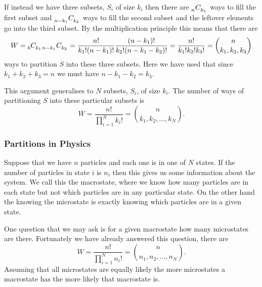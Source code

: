     If instead we have three subsets, \(S_i\) of size \(k_i\) then there are \(\combs{n}{k_1}\) ways to fill the first subset and \(\combs{n-k_1}{k_2}\) ways to fill the second subset and the leftover elements go into the third subset.
    By the multiplication principle this means that there are
    \[W = \combs{b}{k_1}\combs{n-k_1}{k_2} = \frac{n!}{k_1!(n - k_1)!}\frac{(n - k_1)!}{k_2!(n - k_1 - k_2)!} = \frac{n!}{k_1!k_2!k_3!} = {n \choose k_1, k_2, k_3}\]
    ways to partition \(S\) into these three subsets.
    Here we have used that since \(k_1 + k_2 + k_3 = n\) we must have \(n - k_1 - k_2 = k_3\).
    
    This argument generalises to \(N\) subsets, \(S_i\), of size \(k_i\).
    The number of ways of partitioning \(S\) into these particular subsets is
    \[W = \frac{n!}{\prod_{i=1}^{N}k_i!} = {n \choose k_1, k_2, \dotsc, k_N}.\]
    
    \subsubsection{Partitions in Physics}
    Suppose that we have \(n\) particles and each one is in one of \(N\) states.
    If the number of particles in state \(i\) is \(n_i\) then this gives us some information about the system.
    We call this the macrostate, where we know how many particles are in each state but not which particles are in any particular state.
    On the other hand the knowing the microstate is exactly knowing which particles are in a given state.
    
    One question that we may ask is for a given macrostate how many microstates are there.
    Fortunately we have already answered this question, there are
    \[W = \frac{n!}{\prod_{i=1}^{N}n_i!} = {n \choose n_1, n_2, \dotsc, n_N}.\]
    Assuming that all microstates are equally likely the more microstates a macrostate has the more likely that macrostate is.
    

